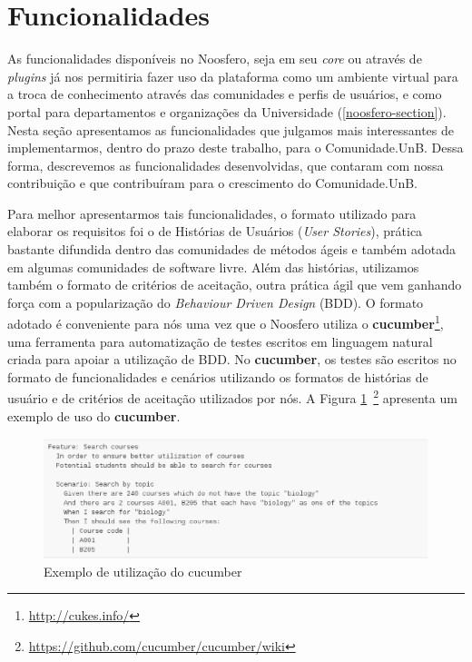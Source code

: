 \section{Funcionalidades}



As funcionalidades disponíveis no Noosfero, seja em seu \textit{core}
ou através de \textit{plugins} já nos permitiria fazer uso da plataforma como
um ambiente virtual para a troca de conhecimento através das comunidades e
perfis de usuários, e como portal para departamentos e organizações da
Universidade (\ref{noosfero-section}).
%
Nesta seção apresentamos as funcionalidades que julgamos mais interessantes
de implementarmos, dentro do prazo deste trabalho, para o Comunidade.UnB.
%
Dessa forma, descrevemos as funcionalidades desenvolvidas, que contaram com
nossa contribuição e que contribuíram para o crescimento do Comunidade.UnB.


Para melhor apresentarmos tais funcionalidades, o formato utilizado para
elaborar os requisitos foi o de Histórias de Usuários (\textit{User Stories}),
prática bastante difundida dentro das comunidades de métodos ágeis e também
adotada em algumas comunidades de software livre. 
%
Além das histórias, utilizamos também o formato de critérios de aceitação, outra
prática ágil que vem ganhando força com a popularização do
\textit{Behaviour Driven Design} (BDD).
%
O formato adotado é conveniente para nós uma vez que o Noosfero utiliza o
\textbf{cucumber}\footnote{\url{http://cukes.info/}}, uma ferramenta para
automatização de testes escritos em linguagem natural criada para apoiar a
utilização de BDD. No \textbf{cucumber}, os testes são escritos no formato
de funcionalidades e cenários utilizando os formatos de histórias de
usuário e de critérios de aceitação utilizados por nós. A Figura
\ref{cucumber}~\footnote{\url{https://github.com/cucumber/cucumber/wiki}}
apresenta um exemplo de uso do \textbf{cucumber}.

\begin{figure}[h]
	\centering
	\includegraphics[keepaspectratio=true,scale=0.6]{figuras/cucumber_sample.eps}
	\caption{Exemplo de utilização do cucumber}
	\label{cucumber}
\end{figure}

